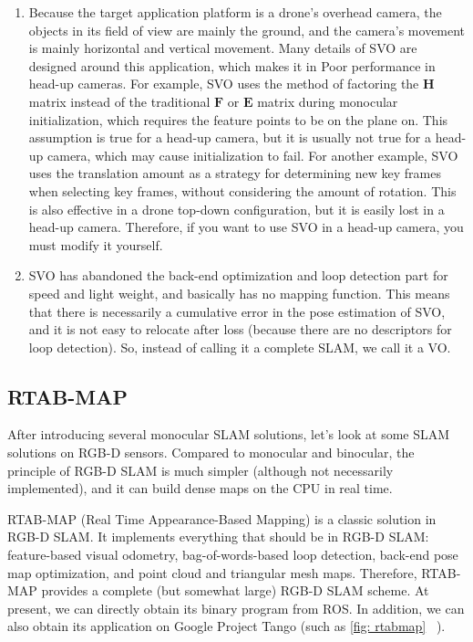 \begin{enumerate}
\item Because the target application platform is a drone's overhead camera, the objects in its field of view are mainly the ground, and the camera's movement is mainly horizontal and vertical movement. Many details of SVO are designed around this application, which makes it in Poor performance in head-up cameras. For example, SVO uses the method of factoring the $ \bm{H} $ matrix instead of the traditional $ \bm{F} $ or $ \bm{E} $ matrix during monocular initialization, which requires the feature points to be on the plane on. This assumption is true for a head-up camera, but it is usually not true for a head-up camera, which may cause initialization to fail. For another example, SVO uses the translation amount as a strategy for determining new key frames when selecting key frames, without considering the amount of rotation. This is also effective in a drone top-down configuration, but it is easily lost in a head-up camera. Therefore, if you want to use SVO in a head-up camera, you must modify it yourself.
\item SVO has abandoned the back-end optimization and loop detection part for speed and light weight, and basically has no mapping function. This means that there is necessarily a cumulative error in the pose estimation of SVO, and it is not easy to relocate after loss (because there are no descriptors for loop detection). So, instead of calling it a complete SLAM, we call it a VO.
\end{enumerate}

\subsection{RTAB-MAP}

After introducing several monocular SLAM solutions, let's look at some SLAM solutions on RGB-D sensors. Compared to monocular and binocular, the principle of RGB-D SLAM is much simpler (although not necessarily implemented), and it can build dense maps on the CPU in real time.

RTAB-MAP (Real Time Appearance-Based Mapping) \textsuperscript{\cite{Labbe2014}} is a classic solution in RGB-D SLAM. It implements everything that should be in RGB-D SLAM: feature-based visual odometry, bag-of-words-based loop detection, back-end pose map optimization, and point cloud and triangular mesh maps. Therefore, RTAB-MAP provides a complete (but somewhat large) RGB-D SLAM scheme. At present, we can directly obtain its binary program from ROS. In addition, we can also obtain its application on Google Project Tango (such as \autoref{fig: rtabmap} ~).

